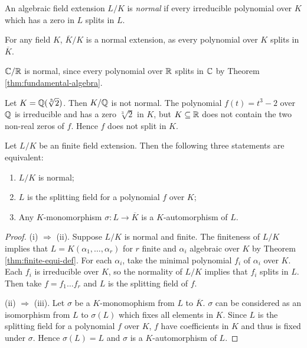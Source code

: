 \begin{definition}
    An algebraic field extension $L/ K$ is \textit{normal} if every irreducible polynomial over $K$ which has a zero in $L$ splits in $L$. 
\end{definition}
\begin{example}
	For any field $K$, $\overline K / K$ is a normal extension, as every polynomial over $K$ splits in $\overline K$. 
\end{example}
\begin{example}
    $\mathbb C / \mathbb R$ is normal, since every polynomial over $\mathbb R$ splits in $\mathbb C$ by Theorem \ref{thm:fundamental-algebra}.
\end{example}
\begin{example}
    Let $K = \mathbb Q(\sqrt[3]{2})$. Then $K / \mathbb Q$ is not normal. The polynomial $f(t) = t^3 - 2$ over $\mathbb Q$ is irreducible and has a zero $\sqrt[3]{2}$ in $K$, but $K \subseteq \mathbb R$ does not contain the two non-real zeros of $f$. Hence $f$ does not split in $K$.
\end{example}

\begin{theorem} \label{thm:normal-equiv-def}
    Let $L/K$ be an finite field extension. Then the following three statements are equivalent:
    \begin{enumerate}[label=(\roman*)]
        \item $L/K$ is normal;
        \item $L$ is the splitting field for a polynomial $f$ over $K$;
        \item Any $K$-monomorphism $\sigma: L \to \overline K$ is a $K$-automorphism of $L$. 
    \end{enumerate}
\end{theorem}

\begin{proof}
    (i) $\Rightarrow$ (ii). 
    Suppose $L/K$ is normal and finite. The finiteness of $L/K$ implies that $L = K(\alpha_1, \dots, \alpha_r)$ for $r$ finite and $\alpha_i$ algebraic over $K$ by Theorem \ref{thm:finite-equi-def}. For each $\alpha_i$, take the minimal polynomial $f_i$ of $\alpha_i$ over $K$. Each $f_i$ is irreducible over $K$, so the normality of $L/K$ implies that $f_i$ splits in $L$.  Then take $f = f_1 \dots f_r$ and $L$ is the splitting field of $f$.
	
    

    (ii) $\Rightarrow$ (iii). Let $\sigma$ be a $K$-monomophism from $L$ to $\overline K$. $\sigma$ can be considered as an isomorphism from $L$ to $\sigma(L)$ which fixes all elements in $K$. Since $L$ is the splitting field for a polynomial $f$ over $K$, $f$ have coefficients in $K$ and thus is fixed under $\sigma$. Hence $\sigma(L) = L$ and $\sigma$ is a $K$-automorphism of $L$. 
\end{proof}

